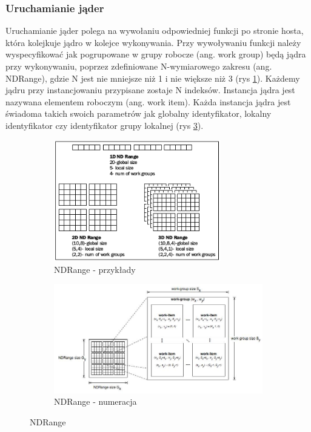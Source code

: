 \documentclass[polish, 12pt]{aghthesis}
\begin{document}
	\subsubsection{Uruchamianie jąder}
	Uruchamianie jąder polega na wywołaniu odpowiedniej funkcji po stronie hosta, która kolejkuje jądro w kolejce wykonywania. Przy wywoływaniu funkcji należy wyspecyfikować jak pogrupowane w grupy robocze (ang. work group) będą jądra przy wykonywaniu, poprzez zdefiniowane N-wymiarowego zakresu (ang. NDRange), gdzie N jest nie mniejsze niż 1 i nie większe niż 3 (rys \ref{fig:ndrange_examples}). Każdemy jądru przy instancjowaniu przypisane zostaje N indeksów. Instancja jądra jest nazywana elementem roboczym (ang. work item). Każda instancja jądra jest świadoma takich swoich parametrów jak globalny identyfikator, lokalny identyfikator czy identyfikator grupy lokalnej (rys \ref{fig:ndrange_numbering}).
	
	
	\begin{figure}
	\centering
		\begin{subfigure}[b]{\textwidth}
			\centering
			\includegraphics[width=0.8\textwidth]{ndrange.png}
			\caption{NDRange - przykłady}
			\label{fig:ndrange_examples}
		\end{subfigure}
		\begin{subfigure}[b]{\textwidth}
			\centering
			\includegraphics[width=\textwidth]{ndrange2.jpg}
			\caption{NDRange - numeracja}
			\label{fig:ndrange_numbering}
		\end{subfigure}
		\caption{NDRange}
	\end{figure}
	
\end{document}
